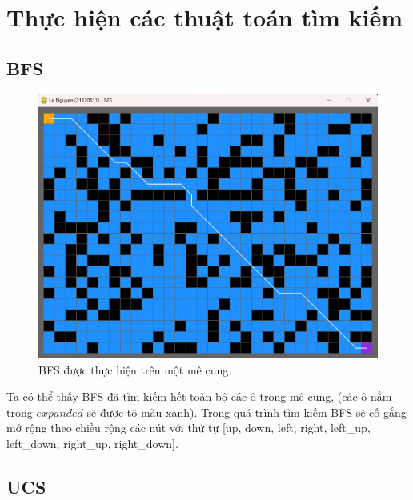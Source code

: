 \chapter{Thực hiện các thuật toán tìm kiếm}

\section{BFS}

\begin{figure}[H]
    \centering
    \includegraphics[scale=0.7]{figure/Implementation/BFS.png}
    \caption{BFS được thực hiện trên một mê cung.}
    \label{fig:imple_BFS}
\end{figure}

Ta có thể thấy BFS đã tìm kiếm hết toàn bộ các ô trong mê cung, (các ô nằm trong $expanded$ sẽ được tô màu xanh). Trong quá trình tìm kiếm BFS sẽ cố gắng mở rộng theo chiều rộng các nút với thứ tự [up, down, left, right, left\_up, left\_down, right\_up, right\_down].

\section{UCS}

